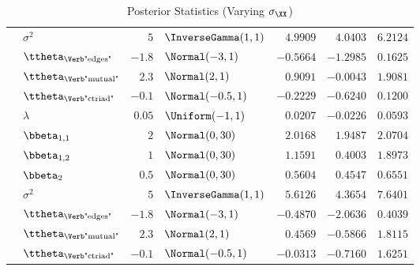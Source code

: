 \begin{table}[t]
\begin{tabular}{cl|rlrrr}
        & $\sigma^2$                       & $5$    & $\InverseGamma(1,1)$ & $4.9909$  & $4.0403$  & $6.2124$ \\
        & $\ttheta_{\text{\Verb"edges"}}$  & $-1.8$ & $\Normal(-3,1)$      & $-0.5664$ & $-1.2985$ & $0.1625$ \\
        & $\ttheta_{\text{\Verb"mutual"}}$ & $2.3$  & $\Normal(2,1)$       & $0.9091$  & $-0.0043$ & $1.9081$ \\
        & $\ttheta_{\text{\Verb"ctriad"}}$ & $-0.1$ & $\Normal(-0.5,1)$    & $-0.2229$ & $-0.6240$ & $0.1200$ \\
		\midrule
        & $\lambda$                        & $0.05$ & $\Uniform(-1,1)$     & $0.0207$  & $-0.0226$ & $0.0593$ \\
        & $\bbeta_{1,1}$                   & $2$    & $\Normal(0,30)$      & $2.0168$  & $1.9487$  & $2.0704$ \\
        & $\bbeta_{1,2}$                   & $1$    & $\Normal(0,30)$      & $1.1591$  & $0.4003$  & $1.8973$ \\
        & $\bbeta_{2}$                     & $0.5$  & $\Normal(0,30)$      & $0.5604$  & $0.4547$  & $0.6551$ \\
        & $\sigma^2$                       & $5$    & $\InverseGamma(1,1)$ & $5.6126$  & $4.3654$  & $7.6401$ \\
        & $\ttheta_{\text{\Verb"edges"}}$  & $-1.8$ & $\Normal(-3,1)$      & $-0.4870$ & $-2.0636$ & $0.4039$ \\
        & $\ttheta_{\text{\Verb"mutual"}}$ & $2.3$  & $\Normal(2,1)$       & $0.4569$  & $-0.5866$ & $1.8115$ \\
        & $\ttheta_{\text{\Verb"ctriad"}}$ & $-0.1$ & $\Normal(-0.5,1)$    & $-0.0313$ & $-0.7160$ & $1.6251$ \\
		\bottomrule
	\end{tabular}\\
	\caption{Posterior Statistics (Varying $\sigma_{\XX}$)}
	\label{tab:S-2}
\end{table}
